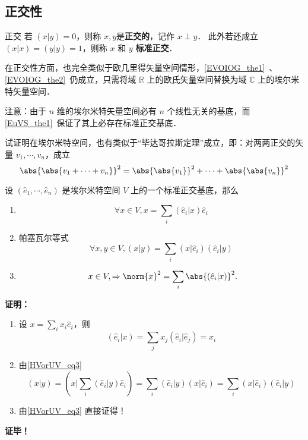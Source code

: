 \subsection{正交性}
\begin{definition}{正交}
若 $(  x|  y)=0$，则称 $  x,  y$是\textbf{正交的}，记作 $  x\perp  y$．
此外若还成立 $(  x|  x)=(  y|  y)=1$，则称 $  x$ 和 $  y$ \textbf{标准正交}．
\end{definition}
在正交性方面，也完全类似于欧几里得矢量空间情形，\autoref{EVOIOG_the1}~、\autoref{EVOIOG_the2}~仍成立，只需将域 $\mathbb{R}$ 上的欧氏矢量空间替换为域 $\mathbb{C}$ 上的埃尔米特矢量空间．

注意：由于 $n$ 维的埃尔米特矢量空间必有 $n$ 个线性无关的基底，而\autoref{EuVS_the1}~保证了其上必存在标准正交基底．
\begin{example}{}
试证明在埃尔米特空间，也有类似于“毕达哥拉斯定理”成立，即：对两两正交的矢量 $  v_1,\cdots,  v_n$，成立
\begin{equation}
\abs{\abs{  v_1+\cdots+  v_n}}^2=\abs{\abs{  v_1}}^2+\cdots+\abs{\abs{  v_n}}^2
\end{equation}
\end{example}

\begin{theorem}{}
设 $(\hat e_1,\cdots, \hat e_n)$ 是埃尔米特空间 $V$ 上的一个标准正交基底，那么
\begin{enumerate}
\item \begin{equation}\label{HVorUV_eq3}
\forall  x\in V,  x=\sum_{i}( \hat e_i|  x)\hat e_i
\end{equation}
\item 帕塞瓦尔等式
\begin{equation}
\forall  x,  y\in V,(  x|  y)=\sum_{i}(  x|\hat e_i)(  \hat e_i|  y)
\end{equation}
\item \begin{equation}
\  x\in V,\Rightarrow\norm{  x}^2=\sum_{i}\abs{(  \hat e_i|  x)}^2.
\end{equation}
\end{enumerate}
\end{theorem}
\textbf{证明：}\begin{enumerate}
\item 设 $  x=\sum_{i}x_i 
 \hat e_i$，则
\begin{equation}
( \hat e_i|  x)=\sum_{j}x_j( \hat e_i| \hat e_j)=x_i
\end{equation}
\item 由\autoref{HVorUV_eq3} 
\begin{equation}
(  x|  y)=(  x|\sum_{i}( \hat e_i|  y) \hat e_i)=\sum_{i}( \hat e_i|  y)(  x| \hat e_i)=\sum_{i}(  x| \hat e_i)( \hat e_i|  y)
\end{equation}
\item 由\autoref{HVorUV_eq3} 直接证得！
\end{enumerate}
\textbf{证毕！}
